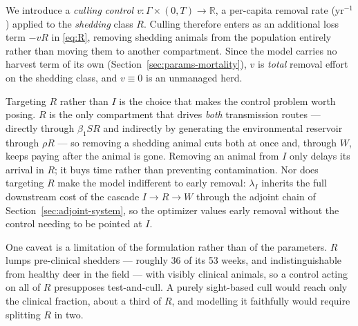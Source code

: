 \documentclass[11pt]{article}
\begin{document}
We introduce a \emph{culling control} $v : \Gamma\times(0,T) \to \mathbb{R}$, a per-capita removal rate (yr$^{-1}$) applied to the \emph{shedding} class $R$. Culling therefore enters as an additional loss term $-vR$ in \eqref{eq:R}, removing shedding animals from the population entirely rather than moving them to another compartment. Since the model carries no harvest term of its own (Section~\ref{sec:params-mortality}), $v$ is \emph{total} removal effort on the shedding class, and $v\equiv 0$ is an unmanaged herd.

Targeting $R$ rather than $I$ is the choice that makes the control problem worth posing. $R$ is the only compartment that drives \emph{both} transmission routes --- directly through $\beta_1 SR$ and indirectly by generating the environmental reservoir through $\rho R$ --- so removing a shedding animal cuts both at once and, through $W$, keeps paying after the animal is gone. Removing an animal from $I$ only delays its arrival in $R$; it buys time rather than preventing contamination. Nor does targeting $R$ make the model indifferent to early removal: $\lambda_I$ inherits the full downstream cost of the cascade $I \to R \to W$ through the adjoint chain of Section~\ref{sec:adjoint-system}, so the optimizer values early removal without the control needing to be pointed at $I$.

One caveat is a limitation of the formulation rather than of the parameters. $R$ lumps pre-clinical shedders --- roughly 36 of its 53 weeks, and indistinguishable from healthy deer in the field --- with visibly clinical animals, so a control acting on all of $R$ presupposes test-and-cull. A purely sight-based cull would reach only the clinical fraction, about a third of $R$, and modelling it faithfully would require splitting $R$ in two.
\end{document}
